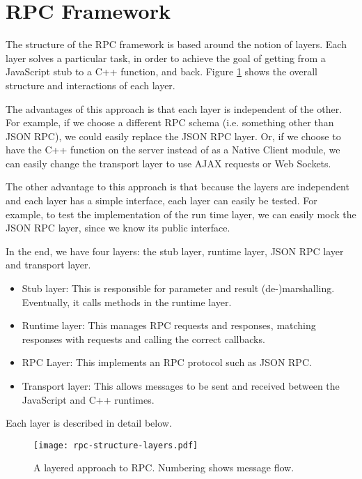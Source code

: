 \section{RPC Framework} %
\label{sec:rpc_framework_structure}

The structure of the RPC framework is based around the notion of layers. 
Each layer solves a particular task, in order to achieve the goal of getting from a JavaScript stub to a C++ function, and back. Figure \ref{fig:structurediagram} shows the overall structure and interactions of each layer.

The advantages of this approach is that each layer is independent of the other. For example, if we choose a different RPC schema (i.e. something other than JSON RPC), we could easily replace the JSON RPC layer. Or, if we choose to have the C++ function on the server instead of as a Native Client module, we can easily change the transport layer to use AJAX requests or Web Sockets. 


The other advantage to this approach is that because the layers are independent and each layer has a simple interface, each layer can easily be tested. For example, to test the implementation of the run time layer, we can easily mock the JSON RPC layer, since we know its public interface.

In the end, we have four layers: the stub layer, runtime layer, JSON RPC layer and transport layer. 

\begin{itemize}
  \item Stub layer: This is responsible for parameter and result (de-)marshalling. Eventually, it calls methods in the runtime layer.
  \item Runtime layer: This manages RPC requests and responses, matching responses with requests and calling the correct callbacks.
  \item RPC Layer: This implements an RPC protocol such as JSON RPC.
  \item Transport layer: This allows messages to be sent and received between the JavaScript and C++ runtimes.
\end{itemize}

Each layer is described in detail below.

\begin{figure}
    \centering
    \texttt{[image: rpc-structure-layers.pdf]} 
    \caption{A layered approach to RPC. Numbering shows message flow.}
    \label{fig:structurediagram}
\end{figure}


